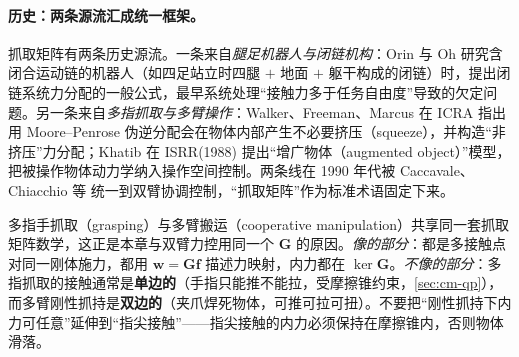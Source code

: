 \paragraph{历史：两条源流汇成统一框架。}
抓取矩阵有两条历史源流。一条来自\emph{腿足机器人与闭链机构}：Orin 与 Oh\cite{orin1986force} 研究含闭合运动链的机器人（如四足站立时四腿 $+$ 地面 $+$ 躯干构成的闭链）时，提出闭链系统力分配的一般公式，最早系统处理“接触力多于任务自由度”导致的欠定问题。另一条来自\emph{多指抓取与多臂操作}：Walker、Freeman、Marcus\cite{walker1988internal} 在 ICRA 指出用 Moore--Penrose 伪逆分配会在物体内部产生不必要挤压（squeeze），并构造“非挤压”力分配；Khatib\cite{khatib1988object} 在 ISRR(1988) 提出“增广物体（augmented object）”模型，把被操作物体动力学纳入操作空间控制\cite{khatib1987operational}。两条线在 1990 年代被 Caccavale、Chiacchio 等\cite{caccavale2008six} 统一到双臂协调控制，“抓取矩阵”作为标准术语固定下来。

\begin{note}
多指手抓取（grasping）与多臂搬运（cooperative manipulation）共享同一套抓取矩阵数学，这正是本章与双臂力控用同一个 $\mathbf{G}$ 的原因。\emph{像的部分}：都是多接触点对同一刚体施力，都用 $\mathbf{w}=\mathbf{G}\mathbf{f}$ 描述力映射，内力都在 $\ker\mathbf{G}$。\emph{不像的部分}：多指抓取的接触通常是\textbf{单边的}（手指只能推不能拉，受摩擦锥约束，\cref{sec:cm-qp}），而多臂刚性抓持是\textbf{双边的}（夹爪焊死物体，可推可拉可扭）。不要把“刚性抓持下内力可任意”延伸到“指尖接触”——指尖接触的内力必须保持在摩擦锥内，否则物体滑落。
\end{note}

